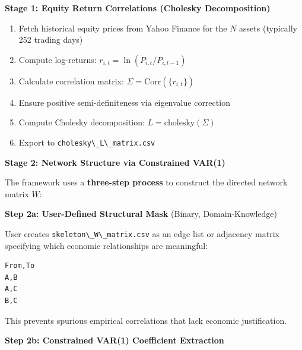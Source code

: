 \documentclass[
]{article}
\newcommand{\passthrough}[1]{#1}
\providecommand{\tightlist}{%
  \setlength{\itemsep}{0pt}\setlength{\parskip}{0pt}}
\begin{document}
\textbf{Stage 1: Equity Return Correlations (Cholesky Decomposition)}

\begin{enumerate}
\def\labelenumi{\arabic{enumi}.}
\tightlist
\item
  Fetch historical equity prices from Yahoo Finance for the \(N\) assets
  (typically 252 trading days)
\item
  Compute log-returns: \(r_{i,t} = \ln(P_{i,t} / P_{i,t-1})\)
\item
  Calculate correlation matrix: \(\Sigma = \text{Corr}(\{r_{i,t}\})\)
\item
  Ensure positive semi-definiteness via eigenvalue correction
\item
  Compute Cholesky decomposition: \(L = \text{cholesky}(\Sigma)\)
\item
  Export to \passthrough{\lstinline!cholesky\_L\_matrix.csv!}
\end{enumerate}

\textbf{Stage 2: Network Structure via Constrained VAR(1)}

The framework uses a \textbf{three-step process} to construct the
directed network matrix \(W\):

\textbf{Step 2a: User-Defined Structural Mask} (Binary,
Domain-Knowledge)

User creates \passthrough{\lstinline!skeleton\_W\_matrix.csv!} as an
edge list or adjacency matrix specifying which economic relationships
are meaningful:

\begin{lstlisting}
From,To
A,B
A,C
B,C
\end{lstlisting}

This prevents spurious empirical correlations that lack economic
justification.

\textbf{Step 2b: Constrained VAR(1) Coefficient Extraction}
\end{document}
